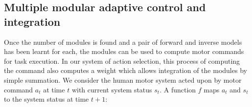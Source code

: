




\subsection{Multiple modular adaptive control and integration}
\label{cha4:sec2:control}

Once the number of modules is found and a pair of forward and inverse
models has been learnt for each, the modules can be used to compute
motor commands for task execution.  In our system of action selection,
this process of computing the command also computes a weight which
allows integration of the modules by simple summation.  We consider
the human motor system acted upon by motor command $a_t$ at time $t$
with current system status $s_t$. A function $f$ maps $a_t$ and $s_t$
to the system status at time $t+1$:

